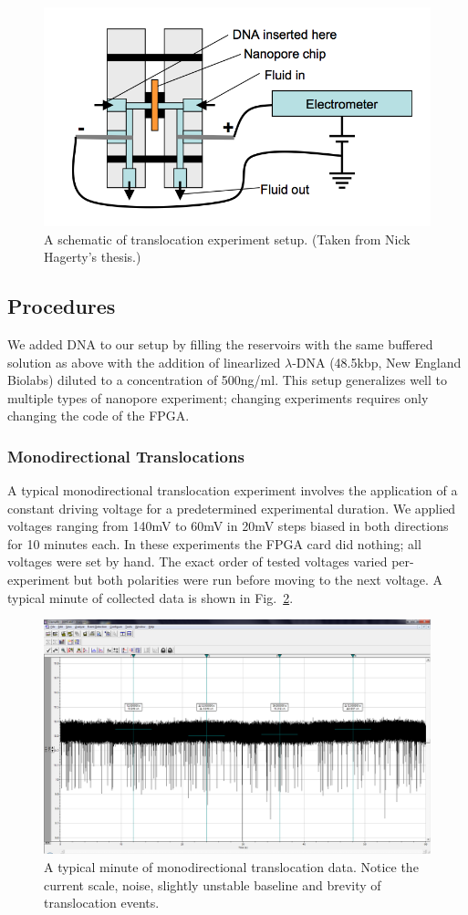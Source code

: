 \documentclass[aps,prl,preprint,groupedaddress]{revtex4}
\begin{document}
\begin{figure}
\centering
\includegraphics[width=.6\textwidth]{figures/chuck}
\caption{A schematic of translocation experiment setup. (Taken from Nick Hagerty's thesis.)}
\label{fig:chuck}
\end{figure}

\subsection{Procedures}

We added DNA to our setup by filling the reservoirs with the same buffered solution as above with the addition of linearlized $\lambda$-DNA (48.5kbp, New England Biolabs) diluted to a concentration of 500ng/ml.
This setup generalizes well to multiple types of nanopore experiment; changing experiments requires only changing the code of the FPGA.

\subsubsection{Monodirectional Translocations}

A typical monodirectional translocation experiment involves the application of a constant driving voltage for a predetermined experimental duration.
We applied voltages ranging from 140mV to 60mV in 20mV steps biased in both directions for 10 minutes each.
In these experiments the FPGA card did nothing; all voltages were set by hand.
The exact order of tested voltages varied per-experiment but both polarities were run before moving to the next voltage.
A typical minute of collected data is shown in Fig.~\ref{fig:trans-data}.
\begin{figure}[h]
\centering
\includegraphics[width=1\textwidth]{figures/monodirectional-minute}
\caption{A typical minute of monodirectional translocation data.
Notice the current scale, noise, slightly unstable baseline and brevity of translocation events.}
\label{fig:trans-data}
\end{figure}
\end{document}
